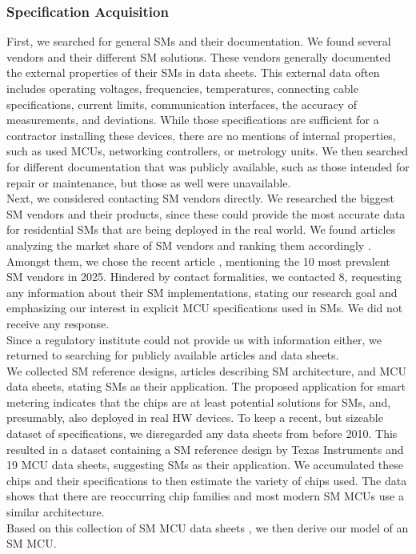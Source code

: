 \documentclass[english]{tudscrartcl}
\begin{document}
			\subsubsection{Specification Acquisition}
				\label{sec:sysmodel_sm_specacqu}
				First, we searched for general \acp{SM} and their documentation.
				We found several vendors and their different \ac{SM} solutions.
				These vendors generally documented the external properties of their \acp{SM} in data sheets.
				This external data often includes operating voltages, frequencies, temperatures, connecting cable specifications, current limits, communication interfaces, the accuracy of measurements, and deviations.
				While those specifications are sufficient for a contractor installing these devices, there are no mentions of internal properties, such as used \acp{MCU}, networking controllers, or metrology units.
				We then searched for different documentation that was publicly available, such as those intended for repair or maintenance, but those as well were unavailable.
				\\
				Next, we considered contacting \ac{SM} vendors directly.
				We researched the biggest \ac{SM} vendors and their products, since these could provide the most accurate data for residential \acp{SM} that are being deployed in the real world.
				We found articles analyzing the market share of \ac{SM} vendors and ranking them accordingly \cite{SMTOP10VENDORS-2024, SMTOP10VENDORS}.
				Amongst them, we chose the recent article \cite{SMTOP10VENDORS}, mentioning the 10 most prevalent \ac{SM} vendors in 2025.
				Hindered by contact formalities, we contacted 8, requesting any information about their \ac{SM} implementations, stating our research goal and emphasizing our interest in explicit \ac{MCU} specifications used in \acp{SM}.
				We did not receive any response.
				\\
				Since a regulatory institute could not provide us with information either, we returned to searching for publicly available articles and data sheets.
				\\
				We collected \ac{SM} reference designs, articles describing \ac{SM} architecture, and \ac{MCU} data sheets, stating \acp{SM} as their application.
				The proposed application for smart metering indicates that the chips are at least potential solutions for \acp{SM}, and, presumably, also deployed in real \ac{HW} devices.
				To keep a recent, but sizeable dataset of specifications, we disregarded any data sheets from before 2010.
				This resulted in a dataset containing a \ac{SM} reference design by Texas Instruments and 19 \ac{MCU} data sheets, suggesting \acp{SM} as their application.
				We accumulated these chips and their specifications to then estimate the variety of chips used.
				The data shows that there are reoccurring chip families and most modern \ac{SM} \acp{MCU} use a similar architecture.
				\\
				Based on this collection of \ac{SM} \ac{MCU} data sheets \cite{ACAE-REPO}, we then derive our model of an \ac{SM} MCU.
				\\
\end{document}
